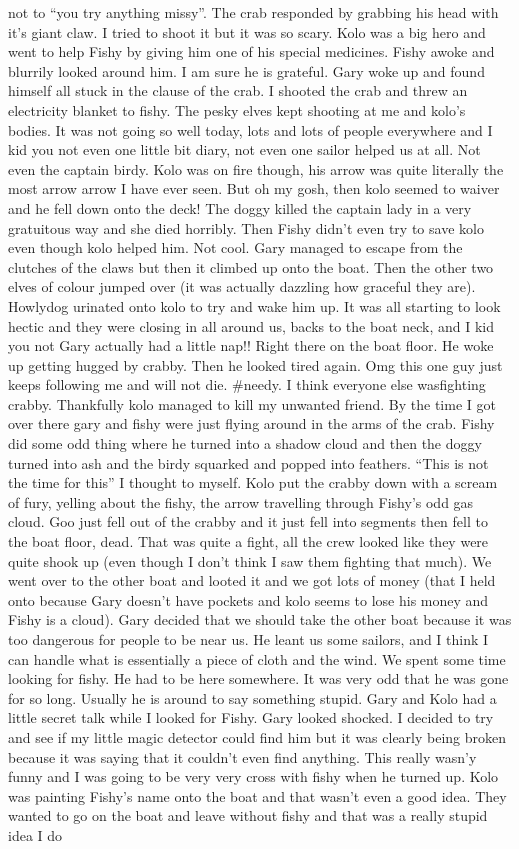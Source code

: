 not to “you try anything missy”. The crab responded by grabbing his head with it’s giant claw. I tried to shoot it but it was so scary. Kolo was a big hero and went to help Fishy by giving him one of his special medicines. Fishy awoke and blurrily looked around him. I am sure he is grateful. Gary woke up and found himself all stuck in the clause of the crab. I shooted the crab and threw an electricity blanket to fishy. The pesky elves kept shooting at me and kolo’s bodies. It was not going so well today, lots and lots of people everywhere and I kid you not even one little bit diary, not even one sailor helped us at all. Not even the captain birdy. Kolo was on fire though, his arrow was quite literally the most arrow arrow I have ever seen. But oh my gosh, then kolo seemed to waiver and he fell down onto the deck! The doggy killed the captain lady in a very gratuitous way and she died horribly. Then Fishy didn’t even try to save kolo even though kolo helped him. Not cool. Gary managed to escape from the clutches of the claws but then it climbed up onto the boat. Then the other two elves of colour jumped over (it was actually dazzling how graceful they are). Howlydog urinated onto kolo to try and wake him up. It was all starting to look hectic and they were closing in all around us, backs to the boat neck, and I kid you not Gary actually had a little nap!! Right there on the boat floor. He woke up getting hugged by crabby. Then he looked tired again. Omg this one guy just keeps following me and will not die. \#needy. I think everyone else wasfighting crabby. Thankfully kolo managed to kill my unwanted friend. By the time I got over there gary and fishy were just flying around in the arms of the crab. Fishy did some odd thing where he turned into a shadow cloud and then the doggy turned into ash and the birdy squarked and popped into feathers. “This is not the time for this” I thought to myself. Kolo put the crabby down with a scream of fury, yelling about the fishy, the arrow travelling through Fishy’s odd gas cloud. Goo just fell out of the crabby and it just fell into segments then fell to the boat floor, dead. That was quite a fight, all the crew looked like they were quite shook up (even though I don’t think I saw them fighting that much). We went over to the other boat and looted it and we got lots of money (that I held onto because Gary doesn’t have pockets and kolo seems to lose his money and Fishy is a cloud). Gary decided that we should take the other boat because it was too dangerous for people to be near us. He leant us some sailors, and I think I can handle what is essentially a piece of cloth and the wind. We spent some time looking for fishy. He had to be here somewhere. It was very odd that he was gone for so long. Usually he is around to say something stupid. Gary and Kolo had a little secret talk while I looked for Fishy. Gary looked shocked. I decided to try and see if my little magic detector could find him but it was clearly being broken because it was saying that it couldn’t even find anything. This really wasn’y funny and I was going to be very very cross with fishy when he turned up. Kolo was painting Fishy’s name onto the boat and that wasn’t even a good idea. They wanted to go on the boat and leave without fishy and that was a really stupid idea I do 